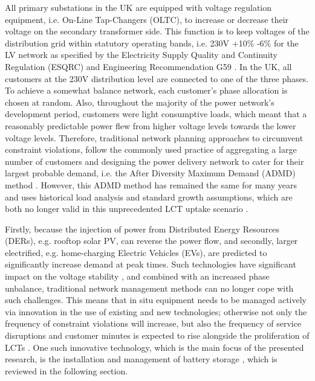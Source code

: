 All primary substations in the UK are equipped with voltage regulation equipment, i.e. On-Line Tap-Changers (OLTC), to increase or decrease their voltage on the secondary transformer side.
This function is to keep voltages of the distribution grid within statutory operating bands, i.e. 230V +10\% -6\% for the LV network as specified by the Electricity Supply Quality and Continuity Regulation (ESQRC) \cite{HealthandSafetyExecutive2002} and Engineering Recommendation G59 \cite{EnergyNetworksAssociation2013}.
In the UK, all customers at the 230V distribution level are connected to one of the three phases.
To achieve a somewhat balance network, each customer's phase allocation is chosen at random.
Also, throughout the majority of the power network's development period, customers were light consumptive loads, which meant that a reasonably predictable power flew from higher voltage levels towards the lower voltage levels.
Therefore, traditional network planning approaches to circumvent constraint violations, follow the commonly used practice of aggregating a large number of customers and designing the power delivery network to cater for their largest probable demand, i.e. the After Diversity Maximum Demand (ADMD) method \cite{Richardson2010a}.
However, this ADMD method has remained the same for many years and uses historical load analysis and standard growth assumptions, which are both no longer valid in this unprecedented LCT uptake scenario \cite{Yunusov2016}.

Firstly, because the injection of power from Distributed Energy Resources (DERs), e.g. rooftop solar PV, can reverse the power flow, and secondly, larger electrified, e.g. home-charging Electric Vehicles (EVs), are predicted to significantly increase demand at peak times.
Such technologies have significant impact on the voltage stability \cite{Petinrin2016}, and combined with an increased phase unbalance, traditional network management methods can no longer cope with such challenges.
This means that in situ equipment needs to be managed actively via innovation in the use of existing and new technologies; otherwise not only the frequency of constraint violations will increase, but also the frequency of service disruptions and customer minutes is expected to rise alongside the proliferation of LCTs \cite{Ault2008a}.
One such innovative technology, which is the main focus of the presented research, is the installation and management of battery storage \cite{Chen2009}, which is reviewed in the following section.















